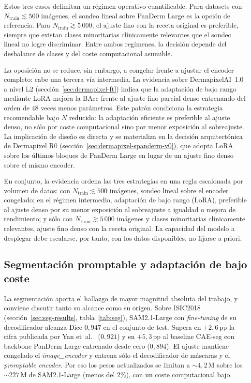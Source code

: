 Estos tres casos delimitan un régimen operativo cuantificable. Para
datasets con $N_{\mathrm{train}} \lesssim 500$ imágenes, el sondeo
lineal sobre PanDerm Large es la opción de referencia. Para
$N_{\mathrm{train}} \gtrsim 5\,000$, el ajuste fino con la receta
original es preferible, siempre que existan clases minoritarias
clínicamente relevantes que el sondeo lineal no logre discriminar.
Entre ambos regímenes, la decisión depende del desbalance de clases
y del coste computacional asumible.

La oposición no se reduce, sin embargo, a congelar frente a ajustar el
encoder completo: cabe una tercera vía intermedia. La evidencia sobre
DermapixelAI~1.0 a nivel L2 (sección~\ref{sec:dermapixel-ft})
indica que la adaptación de bajo rango mediante LoRA mejora la BAcc frente
al ajuste fino parcial denso entrenando del orden de $48$ veces menos
parámetros. Este patrón condiciona la estrategia recomendable bajo $N$
reducido: la adaptación eficiente es preferible al ajuste denso, no sólo
por coste computacional sino por menor exposición al sobreajuste. La
implicación de diseño es directa y se materializa en la decisión
arquitectónica de Dermapixel R0 (sección~\ref{sec:dermapixel-spanderm-v0}),
que adopta LoRA sobre los últimos bloques de PanDerm Large en lugar de un
ajuste fino denso sobre el mismo encoder.

En conjunto, la evidencia ordena las tres estrategias en una regla
escalonada por volumen de datos: con $N_{\mathrm{train}} \lesssim 500$
imágenes, sondeo lineal sobre el encoder congelado; en el régimen
intermedio, adaptación de bajo rango (LoRA), preferible al ajuste denso
por su menor exposición al sobreajuste a igualdad o mejora de
rendimiento; y sólo con $N_{\mathrm{train}} \gtrsim 5\,000$ imágenes y
clases minoritarias clínicamente relevantes, ajuste fino denso con la
receta original. La capacidad del modelo a desplegar debe escalarse, por
tanto, con los datos disponibles, no fijarse a priori.

\subsection{Segmentación promptable y adaptación de bajo coste}
\label{sec:disc-segmentacion}

La segmentación aporta el hallazgo de mayor magnitud absoluta del
trabajo, y conviene discutir tanto su alcance como su origen. Sobre
ISIC2018 (sección~\ref{sec:seg-results}, tabla~\ref{tab:seg}),
SAM2.1-Large con \emph{fine-tuning} de su decodificador alcanza
Dice $0{,}947$ en el conjunto de test. Supera en $+2{,}6$\,pp la
cifra publicada por Yan et~al.~\cite{panderm2025} ($0{,}921$) y
en $+5{,}3$\,pp al baseline CAE-seg con backbone PanDerm Large
entrenado desde cero ($0{,}894$). El ajuste mantiene congelado el
\emph{image\_encoder} y entrena sólo el decodificador de máscaras y
el \emph{promptable encoder}. Por eso los pesos actualizados se
limitan a $\sim 4{,}2$\,M sobre los $\sim 227$\,M de
SAM2.1-Large (menos del $2\%$), con un coste computacional bajo.

